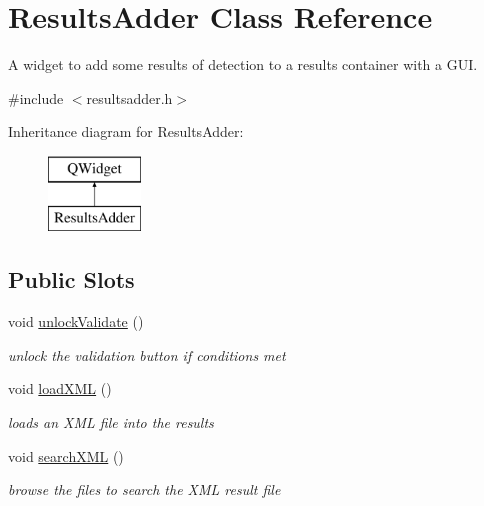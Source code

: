 \hypertarget{class_results_adder}{}\section{Results\+Adder Class Reference}
\label{class_results_adder}


A widget to add some results of detection to a results container with a G\+UI.  




{\ttfamily \#include $<$resultsadder.\+h$>$}

Inheritance diagram for Results\+Adder\+:\begin{figure}[H]
\begin{center}
\leavevmode
\includegraphics[height=2.000000cm]{class_results_adder}
\end{center}
\end{figure}
\subsection*{Public Slots}
\begin{DoxyCompactItemize}
\item 
void \hyperlink{class_results_adder_a97ff952c7d562a74704ca2315cb5dba2}{unlock\+Validate} ()\hypertarget{class_results_adder_a97ff952c7d562a74704ca2315cb5dba2}{}\label{class_results_adder_a97ff952c7d562a74704ca2315cb5dba2}

\begin{DoxyCompactList}\small\item\em unlock the validation button if conditions met \end{DoxyCompactList}\item 
void \hyperlink{class_results_adder_a5040ff5ce4aad855727d3f64d775fcb9}{load\+X\+ML} ()\hypertarget{class_results_adder_a5040ff5ce4aad855727d3f64d775fcb9}{}\label{class_results_adder_a5040ff5ce4aad855727d3f64d775fcb9}

\begin{DoxyCompactList}\small\item\em loads an X\+ML file into the results \end{DoxyCompactList}\item 
void \hyperlink{class_results_adder_a443573d89d5ede3de3ad88989dcd5b1e}{search\+X\+ML} ()\hypertarget{class_results_adder_a443573d89d5ede3de3ad88989dcd5b1e}{}\label{class_results_adder_a443573d89d5ede3de3ad88989dcd5b1e}

\begin{DoxyCompactList}\small\item\em browse the files to search the X\+ML result file \end{DoxyCompactList}\end{DoxyCompactItemize}
